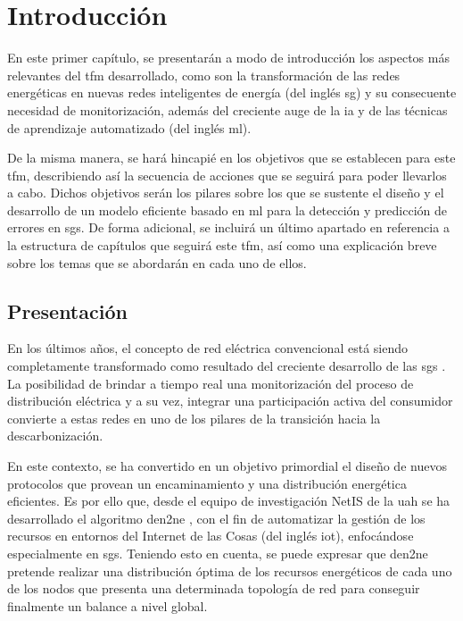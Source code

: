
\chapter{Introducción}
\label{ch:intro}

En este primer capítulo, se presentarán a modo de introducción los aspectos más relevantes del \gls{tfm} desarrollado, como son la transformación de las redes energéticas en nuevas redes inteligentes de energía (del inglés \gls{sg}) y su consecuente necesidad de monitorización, además del creciente auge de la \gls{ia} y de las técnicas de aprendizaje automatizado (del inglés \gls{ml}).

\vspace{3mm}

De la misma manera, se hará hincapié en los objetivos que se establecen para este \gls{tfm}, describiendo así la secuencia de acciones que se seguirá para poder llevarlos a cabo. Dichos objetivos serán los pilares sobre los que se sustente el diseño y el desarrollo de un modelo eficiente basado en \gls{ml} para la detección y predicción de errores en \gls{sg}s. De forma adicional, se incluirá un último apartado en referencia a la estructura de capítulos que seguirá este \gls{tfm}, así como una explicación breve sobre los temas que se abordarán en cada uno de ellos.


\section{Presentación}
\label{sec:presentacion}

En los últimos años, el concepto de red eléctrica convencional está siendo completamente transformado como resultado del creciente desarrollo de las \gls{sg}s \cite{repsol} \cite{impact}. La posibilidad de brindar a tiempo real una monitorización del proceso de distribución eléctrica y a su vez, integrar una participación activa del consumidor convierte a estas redes en uno de los pilares de la transición hacia la descarbonización. 

\vspace{3mm}

En este contexto, se ha convertido en un objetivo primordial el diseño de nuevos protocolos que provean un encaminamiento y una distribución energética eficientes. Es por ello que, desde el equipo de investigación NetIS de la \gls{uah} se ha desarrollado el algoritmo \gls{den2ne} \cite{den2ne}, con el fin de automatizar la gestión de los recursos en entornos del Internet de las Cosas (del inglés \gls{iot}), enfocándose especialmente en \gls{sg}s. Teniendo esto en cuenta, se puede expresar que \gls{den2ne} pretende realizar una distribución óptima de los recursos energéticos de cada uno de los nodos que presenta una determinada topología de red para conseguir finalmente un balance a nivel global. 

